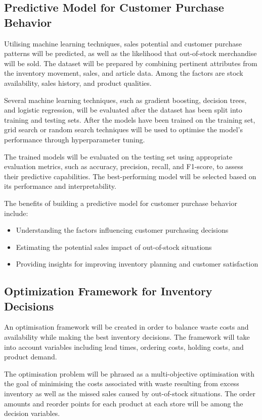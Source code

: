 \documentclass{article}
\begin{document}
\subsection{Predictive Model for Customer Purchase Behavior}
Utilising machine learning techniques, sales potential and customer purchase patterns will be predicted, as well as the likelihood that out-of-stock merchandise will be sold. The dataset will be prepared by combining pertinent attributes from the inventory movement, sales, and article data. Among the factors are stock availability, sales history, and product qualities.

Several machine learning techniques, such as gradient boosting, decision trees, and logistic regression, will be evaluated after the dataset has been split into training and testing sets. After the models have been trained on the training set, grid search or random search techniques will be used to optimise the model's performance through hyperparameter tuning.

The trained models will be evaluated on the testing set using appropriate evaluation metrics, such as accuracy, precision, recall, and F1-score, to assess their predictive capabilities. The best-performing model will be selected based on its performance and interpretability.

The benefits of building a predictive model for customer purchase behavior include:
\begin{itemize}
  \item Understanding the factors influencing customer purchasing decisions
  \item Estimating the potential sales impact of out-of-stock situations
  \item Providing insights for improving inventory planning and customer satisfaction
\end{itemize}

\subsection{Optimization Framework for Inventory Decisions}
An optimisation framework will be created in order to balance waste costs and availability while making the best inventory decisions. The framework will take into account variables including lead times, ordering costs, holding costs, and product demand.

The optimisation problem will be phrased as a multi-objective optimisation with the goal of minimising the costs associated with waste resulting from excess inventory as well as the missed sales caused by out-of-stock situations. The order amounts and reorder points for each product at each store will be among the decision variables.
\end{document}
